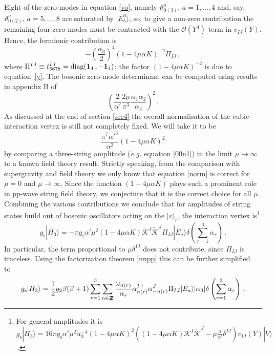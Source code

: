 \documentclass[12pt]{article}
\def\a{\alpha}
\def\b{\beta}
\def\d{\delta}
\def\m{\mu}
\def\o{\omega}
\def\vt{\vartheta}
\def\mc{\mathcal}
\def\ra{\rangle}
\def\dg{\dagger}
\def\wt{\widetilde}
\numberwithin{equation}{section} \setlength{\textwidth}{17cm}
\def\Zop{\bbbz}
\def\bbbz {{\sf Z\!\!Z}}
\begin{document}
Eight of the zero-modes in equation \eqref{vo}, 
namely $\vt_{0(3)}^a$, $a=1,\ldots,4$ and, say, $\vt_{0(2)}^a$, $a=5,\ldots,8$ are saturated by $|E_b^0\ra$, so, to 
give a non-zero contribution the remaining four zero-modes must be contracted with the ${\mc O}(Y^4)$ term in 
$v_{IJ}(Y)$. Hence, the fermionic contribution is
\begin{equation}
-\left(\frac{\a_3}{2}\right)^4(1-4\m\a K)^{-2}\Pi_{IJ}\,,
\end{equation}
where $\Pi^{IJ}\equiv t^{IJ}_{5678}=\text{diag}({\bf 1}_4\,,-{\bf 1}_4)$; 
the factor $(1-4\m\a K)^{-2}$ is due to equation~\eqref{y}.
The bosonic zero-mode determinant can be computed using results in appendix B of~\cite{sv}
\begin{equation}
\left(\frac{2}{\a'}\frac{2\m}{\pi^3}\frac{\a_1\a_2}{\a_3}\right)^2\,.
\end{equation}
As discussed at the end of
section \ref{sec4} the overall normalisation of the cubic interaction vertex is
still not completely fixed. We will take it to be
\begin{equation}\label{norm}
\frac{\pi^7{\a'}^3}{\a^2}(1-4\m\a K)^2
\end{equation}
by comparing a three-string amplitude ({\it e.g.} equation \eqref{00n1}) in the limit $\m\to\infty$ to a known
field theory result. Strictly speaking, from the comparison with supergravity and field theory we
only know that equation \eqref{norm} is correct for $\m=0$ and $\m\to\infty$. Since the
function $(1-4\m\a K)$ plays such a prominent role in pp-wave string field theory, we
conjecture that it is the correct choice for all $\m$. Combining the various contributions
we conclude that for amplitudes of string states build out of bosonic oscillators acting on the $|v\ra_r$, the
interaction vertex is\footnote{For general amplitudes it is
$g_{\text{s}}|H_3\ra=16\pi g_{\text{s}}\a'\m^2\a_3^{-4}(1-4\m\a K)^2
\left((1-4\m\a K){\mc K}^I\wt{\mc K}^J-\m\frac{\a}{\a'}\d^{IJ}\right)v_{IJ}(Y)|V\ra$\,.}
\begin{equation}
g_{\text{s}}|H_3\ra=-\pi g_{\text{s}}\a'\m^2(1-4\m\a K){\mc K}^I\wt{\mc K}^J\Pi_{IJ}|E_a\ra
\d\left(\sum_{r=1}^3\a_r\right)\,.
\end{equation}
In particular, the term proportional to $\m\d^{IJ}$ does not contribute, since $\Pi_{IJ}$ is traceless. 
Using the factorization theorem \eqref{nnpp} this can be 
further simplified to~\cite{vsv,Lee:2002vz}
\begin{equation}\label{heff}
g_{\text{s}}|H_3\ra 
=\frac{1}{2}g_2\b(\b+1)\sum_{r=1}^3\sum_{n\in\Zop}\frac{\o_{n(r)}}{\a_r}\a^{I\,\dg}_{n(r)}
\a^J_{-n(r)}\Pi_{IJ}|E_a\ra|\a_3|\d\left(\sum_{r=1}^3\a_r\right)\,.
\end{equation}
\end{document}
